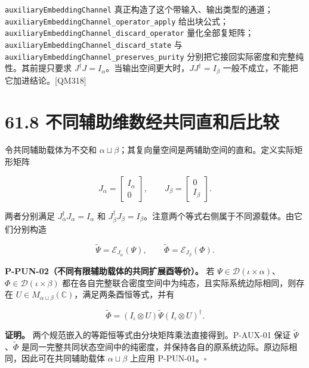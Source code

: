\documentclass[
  11pt,
  oneside]{book}
\begin{document}
\texttt{auxiliaryEmbeddingChannel}
真正构造了这个带输入、输出类型的通道；\texttt{auxiliaryEmbeddingChannel\_\allowbreak operator\_\allowbreak apply}
给出块公式；\texttt{auxiliaryEmbeddingChannel\_\allowbreak discard\_\allowbreak operator}
量化全部复矩阵；\texttt{auxiliaryEmbeddingChannel\_\allowbreak discard\_\allowbreak state} 与
\texttt{auxiliaryEmbeddingChannel\_\allowbreak preserves\_\allowbreak purity}
分别把它接回实际密度和完整纯性。其前提只要求
\(J^\dagger J=I_\alpha\)。当输出空间更大时，\(JJ^\dagger=I_\beta\)
一般不成立，不能把它加进结论。{[}QM318{]}

\hypertarget{ux4e0dux540cux8f85ux52a9ux7ef4ux6570ux7ecfux5171ux540cux76f4ux548cux540eux6bd4ux8f83}{%
\section{61.8
不同辅助维数经共同直和后比较}\label{ux4e0dux540cux8f85ux52a9ux7ef4ux6570ux7ecfux5171ux540cux76f4ux548cux540eux6bd4ux8f83}}

令共同辅助载体为不交和
\(\alpha\sqcup\beta\)；其复向量空间是两辅助空间的直和。定义实际矩形矩阵

\[
J_\alpha=\begin{bmatrix}I_\alpha\\0\end{bmatrix},
\qquad
J_\beta=\begin{bmatrix}0\\I_\beta\end{bmatrix}.
\]

两者分别满足 \(J_\alpha^\dagger J_\alpha=I_\alpha\) 和
\(J_\beta^\dagger J_\beta=I_\beta\)。注意两个等式右侧属于不同源载体。由它们分别构造

\[
\widetilde\Psi=\mathcal E_{J_\alpha}(\Psi),
\qquad
\widetilde\Phi=\mathcal E_{J_\beta}(\Phi).
\]

\protect\hypertarget{p-pun-02}{}{}

\textbf{P-PUN-02（不同有限辅助载体的共同扩展酉等价）。} 若
\(\Psi\in\mathcal D(\iota\times\alpha)\)、\(\Phi\in\mathcal D(\iota\times\beta)\)
都在各自完整联合密度空间中为纯态，且实际系统边际相同，则存在
\(U\in M_{\alpha\sqcup\beta}(\mathbb C)\)，满足两条酉恒等式，并有

\[
\widetilde\Phi
=(I_\iota\otimes U)\widetilde\Psi(I_\iota\otimes U)^\dagger.
\]

\textbf{证明。} 两个规范嵌入的等距恒等式由分块矩阵乘法直接得到。P-AUX-01
保证 \(\widetilde\Psi\)、\(\widetilde\Phi\)
是同一完整共同状态空间中的纯密度，并保持各自的原系统边际。原边际相同，因此可在共同辅助载体
\(\alpha\sqcup\beta\) 上应用 P-PUN-01。\(\square\)
\end{document}
